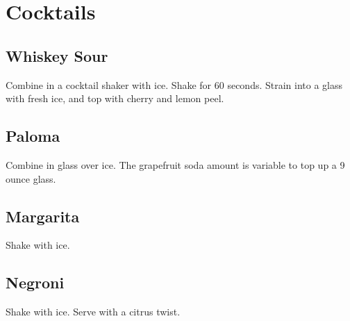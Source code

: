 \section{Cocktails}
\begin{recipe}

\subsection{Whiskey Sour}


Combine in a cocktail shaker with ice. Shake for 60 seconds. Strain into a glass 
with fresh ice, and top with cherry and lemon peel. 

\subsection{Paloma}


Combine in glass over ice. The grapefruit soda amount is variable to top up a 9 ounce glass. 

\subsection{Margarita}


Shake with ice. 

\subsection{Negroni}


Shake with ice. Serve with a citrus twist. 

\end{recipe}
